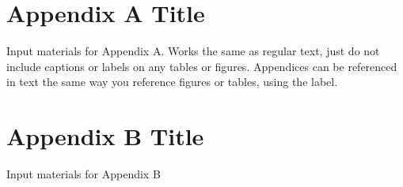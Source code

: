 \documentclass{article}
\begin{document}
\begin{doublespacing}
\begin{appendices}
\section{Appendix A Title}
\label{appendix:appendix_a_label}

Input materials for Appendix A. Works the same as regular text, just do not include captions or labels on any tables or figures. Appendices can be referenced in text the same way you reference figures or tables, using the label. 

\newpage

\section{Appendix B Title}
\label{appendix:appendix_b_label}

Input materials for Appendix B

\end{appendices}

\newpage %
\end{doublespacing} %
\end{document}
